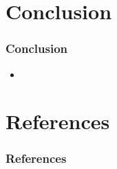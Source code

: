 \documentclass{beamer}
\begin{document}
\section{Conclusion}
\begin{frame}
  \frametitle{Conclusion}
  \begin{itemize}
  \item
  \end{itemize}
\end{frame}


\section{References}
\begin{frame}
  \frametitle{References}
  {}
  
\end{frame}
\end{document}
